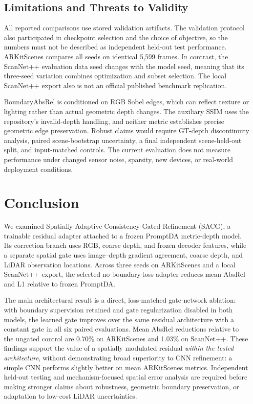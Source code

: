 \subsection{Limitations and Threats to Validity}
All reported comparisons use stored validation artifacts. The validation protocol also participated in checkpoint selection and the choice of objective, so the numbers must not be described as independent held-out test performance. ARKitScenes compares all seeds on identical 5,599 frames. In contrast, the ScanNet++ evaluation data seed changes with the model seed, meaning that its three-seed variation combines optimization and subset selection. The local ScanNet++ export also is not an official published benchmark replication.

BoundaryAbsRel is conditioned on RGB Sobel edges, which can reflect texture or lighting rather than actual geometric depth changes. The auxiliary SSIM uses the repository's invalid-depth handling, and neither metric establishes precise geometric edge preservation. Robust claims would require GT-depth discontinuity analysis, paired scene-bootstrap uncertainty, a final independent scene-held-out split, and input-matched controls. The current evaluation does not measure performance under changed sensor noise, sparsity, new devices, or real-world deployment conditions.

\section{Conclusion}
We examined Spatially Adaptive Consistency-Gated Refinement (SACG), a trainable residual adapter attached to a frozen PromptDA metric-depth model. Its correction branch uses RGB, coarse depth, and frozen decoder features, while a separate spatial gate uses image--depth gradient agreement, coarse depth, and LiDAR observation locations. Across three seeds on ARKitScenes and a local ScanNet++ export, the selected no-boundary-loss adapter reduces mean AbsRel and L1 relative to frozen PromptDA.

The main architectural result is a direct, loss-matched gate-network ablation: with boundary supervision retained and gate regularization disabled in both models, the learned gate improves over the same residual architecture with a constant gate in all six paired evaluations. Mean AbsRel reductions relative to the ungated control are 0.70\% on ARKitScenes and 1.03\% on ScanNet++. These findings support the value of a spatially modulated residual \emph{within the tested architecture}, without demonstrating broad superiority to CNN refinement: a simple CNN performs slightly better on mean ARKitScenes metrics. Independent held-out testing and mechanism-focused spatial error analysis are required before making stronger claims about robustness, geometric boundary preservation, or adaptation to low-cost LiDAR uncertainties.
